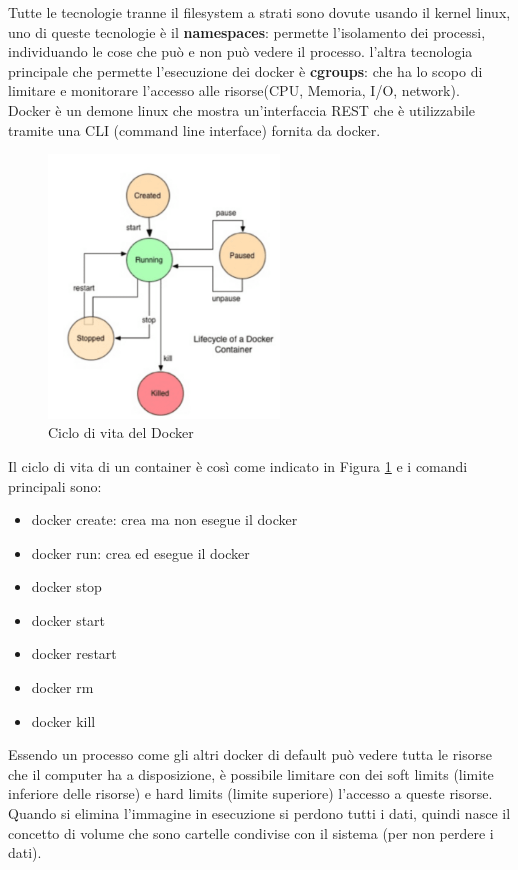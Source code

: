 \documentclass[11pt, twocolumn]{article}
\newenvironment{myitemize}
{ \begin{itemize}[topsep=0ex]
		\setlength{\itemsep}{0pt}
		\setlength{\parskip}{0pt}
		\setlength{\parsep}{0pt}     }
	{ \end{itemize}                  }
\begin{document}
Tutte le tecnologie tranne il filesystem a strati sono dovute usando il kernel linux, uno di queste tecnologie è il \textbf{namespaces}: permette l'isolamento dei processi, individuando le cose che può e non può vedere il processo. 
l'altra tecnologia principale che permette l'esecuzione dei docker è \textbf{cgroups}: che ha lo scopo di limitare e monitorare l'accesso alle risorse(CPU, Memoria, I/O, network).\\
Docker è un demone linux che mostra un'interfaccia REST che è utilizzabile tramite una CLI (command line interface) fornita da docker.
\begin{figure}[!h]
	\includegraphics[width=\linewidth,height=7cm]{imgs/Docker_life.png}
	\caption{Ciclo di vita del Docker}
	\label{fig:dlife}
\end{figure}
Il ciclo di vita di un container è così come indicato in Figura \ref{fig:dlife} e i comandi principali sono:
\begin{myitemize}
	\item docker create: crea ma non esegue il docker
	\item docker run: crea ed esegue il docker
	\item docker stop
	\item docker start
	\item docker restart
	\item docker rm
	\item docker kill
\end{myitemize}
Essendo un processo come gli altri docker di default può vedere tutta le risorse che il computer ha a disposizione, è possibile limitare con dei soft limits (limite inferiore delle risorse) e hard limits (limite superiore) l'accesso a queste risorse.\\
Quando si elimina l'immagine in esecuzione si perdono tutti i dati, quindi nasce il concetto di volume che sono cartelle condivise con il sistema (per non perdere i dati).
\end{document}
